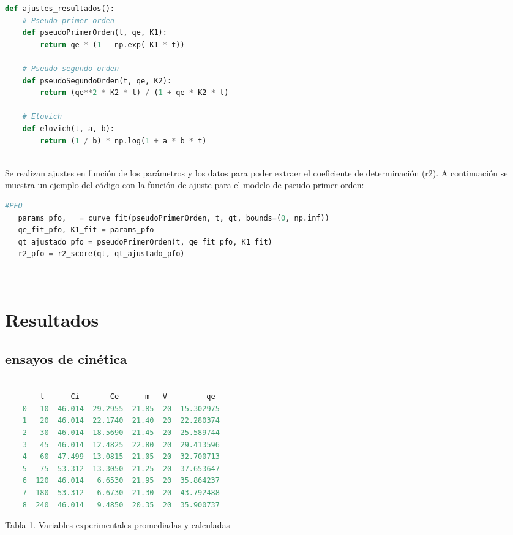 \documentclass[]{article}
\begin{document}
 \begin{lstlisting}[language=Python,style=mystyle]
 def ajustes_resultados():
    # Pseudo primer orden
    def pseudoPrimerOrden(t, qe, K1):
        return qe * (1 - np.exp(-K1 * t))
    
    # Pseudo segundo orden
    def pseudoSegundoOrden(t, qe, K2):
        return (qe**2 * K2 * t) / (1 + qe * K2 * t)
    
    # Elovich
    def elovich(t, a, b):
        return (1 / b) * np.log(1 + a * b * t)
    	
 \end{lstlisting} 
 Se realizan ajustes en función de los parámetros y los datos para poder extraer el coeficiente de determinación (r2). A continuación se muestra un ejemplo del código con la función de ajuste para el modelo de pseudo primer orden:
 
 \begin{lstlisting}[language=Python,style=mystyle]
 #PFO
   params_pfo, _ = curve_fit(pseudoPrimerOrden, t, qt, bounds=(0, np.inf))
   qe_fit_pfo, K1_fit = params_pfo
   qt_ajustado_pfo = pseudoPrimerOrden(t, qe_fit_pfo, K1_fit)
   r2_pfo = r2_score(qt, qt_ajustado_pfo)
 	
 	
 \end{lstlisting} 
 
\normalsize 
\section{Resultados}
\subsection{ensayos de cinética}

 \begin{center}
 \begin{lstlisting}[language=Python,style=mystyle]
 	    	
 	    t      Ci       Ce      m   V         qe
 	0   10  46.014  29.2955  21.85  20  15.302975
 	1   20  46.014  22.1740  21.40  20  22.280374
 	2   30  46.014  18.5690  21.45  20  25.589744
 	3   45  46.014  12.4825  22.80  20  29.413596
 	4   60  47.499  13.0815  21.05  20  32.700713
 	5   75  53.312  13.3050  21.25  20  37.653647
 	6  120  46.014   6.6530  21.95  20  35.864237
 	7  180  53.312   6.6730  21.30  20  43.792488
 	8  240  46.014   9.4850  20.35  20  35.900737
 \end{lstlisting}
\end{center} 
\begin{center}
	\caption{Tabla 1. Variables experimentales promediadas y calculadas}
\end{center}
\end{document}
